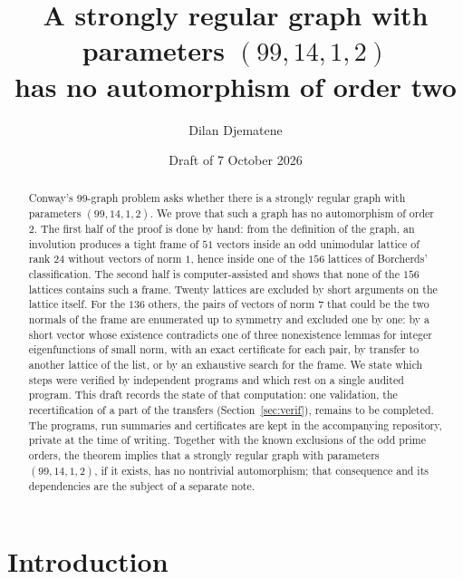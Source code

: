 \documentclass[11pt]{amsart}
\title[No involution on a strongly regular graph $(99,14,1,2)$]{A strongly regular graph with parameters $(99,14,1,2)$\\ has no automorphism of order two}
\author{Dilan Djematene}
\date{Draft of 7 October 2026}
\theoremstyle{definition}
\theoremstyle{remark}
\begin{document}
\begin{abstract}
Conway's 99-graph problem asks whether there is a strongly regular graph with parameters $(99,14,1,2)$. We prove that such a
graph has no automorphism of order $2$. The first half of the proof is done by hand: from the definition of the graph, an
involution produces a tight frame of $51$ vectors inside an odd unimodular lattice of rank $24$ without vectors of norm $1$,
hence inside one of the $156$ lattices of Borcherds' classification. The second half is computer-assisted and shows that none
of the $156$ lattices contains such a frame. Twenty lattices are excluded by short arguments on the lattice itself. For the
$136$ others, the pairs of vectors of norm $7$ that could be the two normals of the frame are enumerated up to symmetry and
excluded one by one: by a short vector whose existence contradicts one of three nonexistence lemmas for integer eigenfunctions
of small norm, with an exact certificate for each pair, by transfer to another lattice of the list, or by an exhaustive search for the frame. We state which steps were
verified by independent programs and which rest on a single audited program. This draft records the state of that computation: one validation, the recertification of a part of the transfers
(Section~\ref{sec:verif}), remains to be completed. The programs, run summaries and certificates are kept in the
accompanying repository, private at the time of writing. Together with the known exclusions of the odd prime orders, the theorem implies that a strongly regular graph with
parameters $(99,14,1,2)$, if it exists, has no nontrivial automorphism; that consequence and its dependencies are the
subject of a separate note.
\end{abstract}

\maketitle

\section{Introduction}
\end{document}
